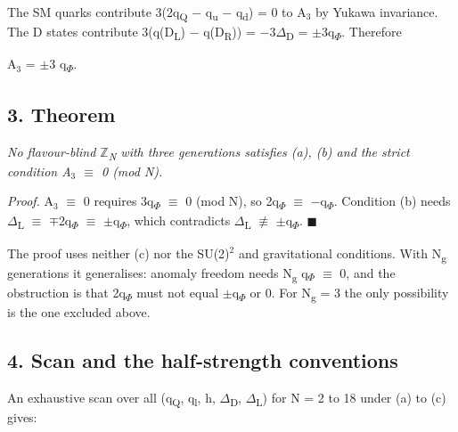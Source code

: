 \documentclass[
  11pt,
]{article}
\begin{document}
The SM quarks contribute 3(2q\textsubscript{Q} \ensuremath{-} q\textsubscript{u} \ensuremath{-} q\textsubscript{d}) = 0 to A\ensuremath{_{3}} by Yukawa invariance. The D states contribute 3(q(D\textsubscript{L}) \ensuremath{-} q(D\textsubscript{R})) = \ensuremath{-}3\ensuremath{\Delta}\textsubscript{D} = \ensuremath{\pm}3q\textsubscript{\ensuremath{\Phi}}. Therefore

A\ensuremath{_{3}} = \ensuremath{\pm}3 q\textsubscript{\ensuremath{\Phi}}.

\hypertarget{theorem}{%
\subsection{3. Theorem}\label{theorem}}

\emph{No flavour-blind \ensuremath{\mathbb{Z}}\textsubscript{N} with three generations satisfies (a), (b) and the strict condition A\ensuremath{_{3}} \ensuremath{\equiv} 0 (mod N).}

\emph{Proof.} A\ensuremath{_{3}} \ensuremath{\equiv} 0 requires 3q\textsubscript{\ensuremath{\Phi}} \ensuremath{\equiv} 0 (mod N), so 2q\textsubscript{\ensuremath{\Phi}} \ensuremath{\equiv} \ensuremath{-}q\textsubscript{\ensuremath{\Phi}}. Condition (b) needs \ensuremath{\Delta}\textsubscript{L} \ensuremath{\equiv} \ensuremath{\mp}2q\textsubscript{\ensuremath{\Phi}} \ensuremath{\equiv} \ensuremath{\pm}q\textsubscript{\ensuremath{\Phi}}, which contradicts \ensuremath{\Delta}\textsubscript{L} \ensuremath{\not\equiv} \ensuremath{\pm}q\textsubscript{\ensuremath{\Phi}}. \ensuremath{\blacksquare}

The proof uses neither (c) nor the SU(2)\ensuremath{^{2}} and gravitational conditions. With N\textsubscript{g} generations it generalises: anomaly freedom needs N\textsubscript{g} q\textsubscript{\ensuremath{\Phi}} \ensuremath{\equiv} 0, and the obstruction is that 2q\textsubscript{\ensuremath{\Phi}} must not equal \ensuremath{\pm}q\textsubscript{\ensuremath{\Phi}} or 0. For N\textsubscript{g} = 3 the only possibility is the one excluded above.

\hypertarget{scan-and-the-half-strength-conventions}{%
\subsection{4. Scan and the half-strength conventions}\label{scan-and-the-half-strength-conventions}}

An exhaustive scan over all (q\textsubscript{Q}, q\textsubscript{l}, h, \ensuremath{\Delta}\textsubscript{D}, \ensuremath{\Delta}\textsubscript{L}) for N = 2 to 18 under (a) to (c) gives:
\end{document}
